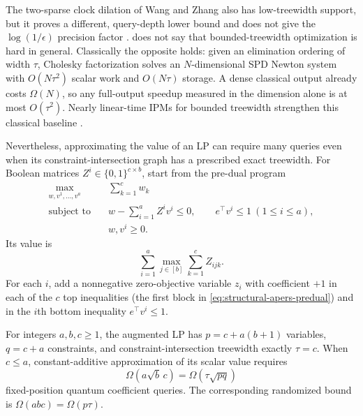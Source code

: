 The two-sparse clock dilation of Wang and Zhang also has low-treewidth
support, but it proves a different, query-depth lower bound and does not give
the $\log(1/\epsilon)$ precision factor
\cite{wang2024-tight-quantum-depth-lower-bound}.
 does not say that bounded-treewidth
optimization is hard in general.  Classically the opposite holds: given an
elimination ordering of width $\tau$, Cholesky factorization solves an
$N$-dimensional SPD Newton system with $O(N\tau^2)$ scalar work and
$O(N\tau)$ storage.  A dense classical output already costs $\Omega(N)$,
so any full-output speedup measured in the dimension alone is at most
$O(\tau^2)$.  Nearly linear-time
IPMs for bounded treewidth strengthen this classical baseline
\cite{dong2020-a-nearly-linear-time-algorithm,gu2022-a-faster-small-treewidth-sdp}.

Nevertheless, approximating the value of an LP can require many queries
even when its constraint-intersection graph has a prescribed exact
treewidth.
For Boolean matrices $Z^i\in\{0,1\}^{c\times b}$, start from the pre-dual
program
\begin{equation}
 \begin{aligned}
  \max_{w,v^1,\ldots,v^a}\quad&\sum_{k=1}^c w_k\\
  \text{subject to}\quad&
  w-\sum_{i=1}^a Z^iv^i\leq0,\qquad
  e^\top v^i\leq1\ (1\leq i\leq a),\\
  &w,v^i\geq0.
 \end{aligned}                                            \label{eq:structural-apers-predual}
\end{equation}
Its value is
\begin{equation}
 \sum_{i=1}^a\max_{j\in[b]}\sum_{k=1}^c Z_{ijk}.          \label{eq:structural-apers-value}
\end{equation}
For each $i$, add a nonnegative zero-objective variable $z_i$ with
coefficient $+1$ in each of the $c$ top inequalities (the first block in
\eqref{eq:structural-apers-predual}) and in the $i$th bottom inequality
$e^\top v^i\leq1$.

\begin{theorem}
\label{thm:structural-exact-treewidth}
For integers $a,b,c\geq1$, the augmented LP has
$p=c+a(b+1)$ variables, $q=c+a$ constraints, and
constraint-intersection treewidth exactly $\tau=c$.  When $c\leq a$,
constant-additive approximation of its scalar value requires
\begin{equation}
 \Omega(a\sqrt b\,c)=\Omega(\tau\sqrt{pq})                \label{eq:structural-exact-treewidth-value}
\end{equation}
fixed-position quantum coefficient queries.  The corresponding randomized
bound is $\Omega(abc)=\Omega(p\tau)$.
\end{theorem}

